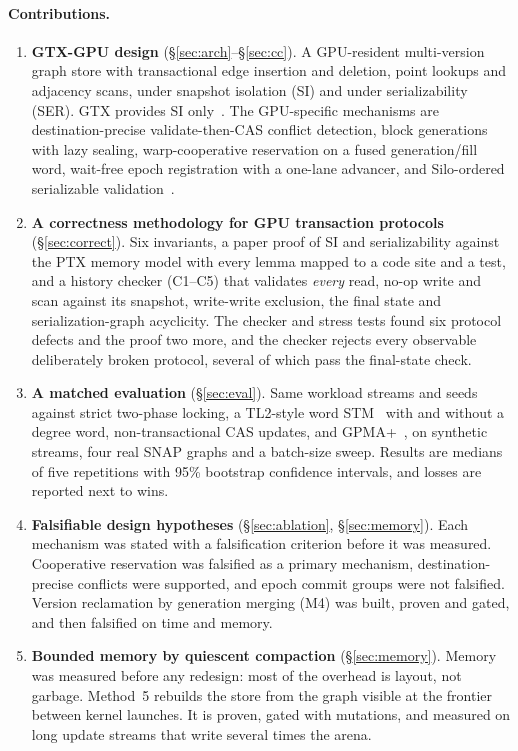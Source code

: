 \documentclass[sigconf,nonacm]{acmart}
\newcommand{\sys}{GTX-GPU}
\begin{document}
\paragraph{Contributions.}
\begin{enumerate}
\item \textbf{\sys{} design} (\S\ref{sec:arch}--\S\ref{sec:cc}). A GPU-resident multi-version graph store with
transactional edge insertion and deletion, point lookups and adjacency scans, under snapshot isolation (SI) and under
serializability (SER). GTX provides SI only~\cite{gtx}. The GPU-specific mechanisms are destination-precise
validate-then-CAS conflict detection, block generations with lazy sealing, warp-cooperative reservation on a fused
generation/fill word, wait-free epoch registration with a one-lane advancer, and Silo-ordered serializable
validation~\cite{silo}.
\item \textbf{A correctness methodology for GPU transaction protocols} (\S\ref{sec:correct}). Six invariants, a paper
proof of SI and serializability against the PTX memory model with every lemma mapped to a code site and a test, and a
history checker (C1--C5) that validates \emph{every} read, no-op write and scan against its snapshot, write-write
exclusion, the final state and serialization-graph acyclicity. The checker and stress tests found six protocol
defects and the proof two more, and the checker rejects every observable deliberately broken protocol, several of
which pass the final-state check.
\item \textbf{A matched evaluation} (\S\ref{sec:eval}). Same workload streams and seeds against strict two-phase locking,
a TL2-style word STM~\cite{tl2} with and without a degree word, non-transactional CAS updates, and GPMA+~\cite{gpma},
on synthetic streams, four real SNAP graphs and a batch-size sweep. Results are medians of five repetitions with 95\%
bootstrap confidence intervals, and losses are reported next to wins.
\item \textbf{Falsifiable design hypotheses} (\S\ref{sec:ablation}, \S\ref{sec:memory}). Each mechanism was stated with
a falsification criterion before it was measured. Cooperative reservation was falsified as a primary mechanism,
destination-precise conflicts were supported, and epoch commit groups were not falsified. Version reclamation by
generation merging (M4) was built, proven and gated, and then falsified on time and memory.
\item \textbf{Bounded memory by quiescent compaction} (\S\ref{sec:memory}). Memory was measured before any redesign:
most of the overhead is layout, not garbage. Method~5 rebuilds the store from the graph visible at the frontier
between kernel launches. It is proven, gated with mutations, and measured on long update streams that write several
times the arena.
\end{enumerate}
\end{document}
